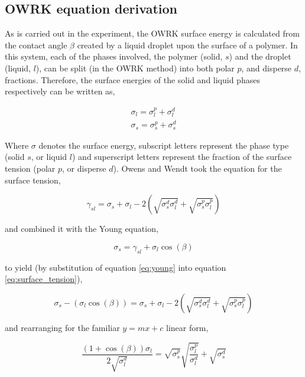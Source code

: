 \subsection{OWRK equation derivation}
As is carried out in the experiment, the OWRK surface energy is calculated from the contact angle $\beta$ created by a liquid droplet upon the surface of a polymer. In this system, each of the phases involved, the polymer (solid, $s$) and the droplet (liquid, $l$), can be split (in the OWRK method) into both polar $p$, and disperse $d$, fractions. Therefore, the surface energies of the solid and liquid phases respectively can be written as,

\begin{eqnarray}
\sigma_l=\sigma_l^p+\sigma_l^d\\
\sigma_s=\sigma_s^p+\sigma_s^d
\end{eqnarray}

Where $\sigma$ denotes the surface energy, subscript letters represent the phase type (solid $s$, or liquid $l$) and superscript letters represent the fraction of the surface tension (polar $p$, or disperse $d$). Owens and Wendt took the equation for the surface tension,

\begin{equation}
\gamma_{sl}=\sigma_s+\sigma_l-2\left(\sqrt{\sigma_s^d\sigma_l^d}+\sqrt{\sigma_s^p\sigma_l^p}\right)
\label{eq:surface_tension}
\end{equation}

\noindent and combined it with the Young equation,

\begin{equation}
\sigma_s=\gamma_{sl}+\sigma_l\cos{\left(\beta\right)}
\label{eq:young}
\end{equation}

\noindent to yield (by substitution of equation \ref{eq:young} into equation \ref{eq:surface_tension}),

\begin{equation}
\sigma_s-\left(\sigma_l\cos{\left(\beta\right)}\right)=\sigma_s+\sigma_l-2\left(\sqrt{\sigma_s^d\sigma_l^d}+\sqrt{\sigma_s^p\sigma_l^p}\right)
\end{equation}

\noindent and rearranging  for the familiar $y=mx+c$ linear form,

\begin{equation}
\frac{\left(1+\cos{\left(\beta\right)}\right)\sigma_l}{2\sqrt{\sigma_l^d}}=\sqrt{\sigma_s^p}\sqrt{\frac{\sigma_l^p}{\sigma_l^d}}+\sqrt{\sigma_s^d}
\label{eq:owrk}
\end{equation}

